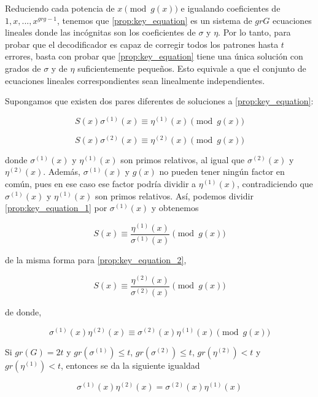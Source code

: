 Reduciendo cada potencia de $x \pmod{g(x)}$ e igualando coeficientes de $1, x, ..., x^{gr g - 1}$, tenemos que \ref{prop:key_equation} es un sistema de $gr G$ ecuaciones lineales donde las incógnitas son los coeficientes de $\sigma$ y $\eta$. Por lo tanto, para probar que el decodificador es capaz de corregir todos los patrones hasta $t$ errores, basta con probar que \ref{prop:key_equation} tiene una única solución con grados de $\sigma$ y de $\eta$ suficientemente pequeños. Esto equivale a que el conjunto de ecuaciones lineales correspondientes sean linealmente independientes.

Supongamos que existen dos pares diferentes de soluciones a \ref{prop:key_equation}:

\begin{equation}
    \label{prop:key_equation_1}
    S(x) \sigma^{(1)}(x) \equiv \eta^{(1)}(x) \pmod{g(x)}
\end{equation}

\begin{equation}
    \label{prop:key_equation_2}
    S(x) \sigma^{(2)}(x) \equiv \eta^{(2)}(x) \pmod{g(x)}
\end{equation}

donde $\sigma^{(1)}(x)$ y $\eta^{(1)}(x)$ son primos relativos, al igual que $\sigma^{(2)}(x)$ y $\eta^{(2)}(x)$. Además, $\sigma^{(1)}(x)$ y $g(x)$ no pueden tener ningún factor en común, pues en ese caso ese factor podría dividir a $\eta^{(1)}(x)$, contradiciendo que $\sigma^{(1)}(x)$ y $\eta^{(1)}(x)$ son primos relativos. Así, podemos dividir \ref{prop:key_equation_1} por $\sigma^{(1)}(x)$ y obtenemos

$$S(x) \equiv \frac{\eta^{(1)}(x)}{\sigma^{(1)}(x)} \pmod{g(x)}$$

de la misma forma para \ref{prop:key_equation_2},

$$S(x) \equiv \frac{\eta^{(2)}(x)}{\sigma^{(2)}(x)} \pmod{g(x)}$$

de donde,

\begin{equation}
    \label{prop:key_equation_12}
    \sigma^{(1)}(x) \eta^{(2)}(x) \equiv \sigma^{(2)}(x) \eta^{(1)}(x) \pmod{g(x)}
\end{equation}

Si $gr(G) = 2t$ y $gr(\sigma^{(1)}) \leq t$, $gr(\sigma^{(2)}) \leq t$, $gr(\eta^{(2)}) < t$ y $gr(\eta^{(1)}) < t$, entonces se da la siguiente igualdad

\begin{equation}
    \label{prop:key_equation_caso1}
    \sigma^{(1)}(x) \eta^{(2)}(x) = \sigma^{(2)}(x) \eta^{(1)}(x)
\end{equation}

